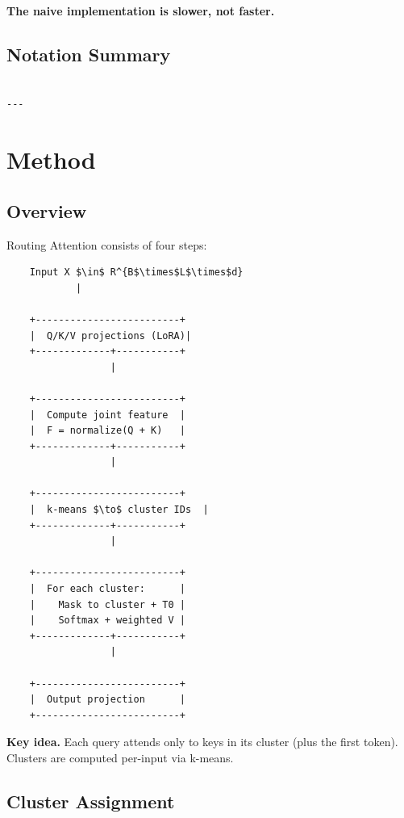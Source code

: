\textbf{The naive implementation is slower, not faster.}

\subsection{Notation Summary}

\begin{lstlisting}

---
\end{lstlisting}


\section{Method}

\subsection{Overview}

Routing Attention consists of four steps:

\begin{lstlisting}
    Input X $\in$ R^{B$\times$L$\times$d}
            |
             
    +-------------------------+
    |  Q/K/V projections (LoRA)|
    +-------------+-----------+
                  |
                   
    +-------------------------+
    |  Compute joint feature  |
    |  F = normalize(Q + K)   |
    +-------------+-----------+
                  |
                   
    +-------------------------+
    |  k-means $\to$ cluster IDs  |
    +-------------+-----------+
                  |
                   
    +-------------------------+
    |  For each cluster:      |
    |    Mask to cluster + T0 |
    |    Softmax + weighted V |
    +-------------+-----------+
                  |
                   
    +-------------------------+
    |  Output projection      |
    +-------------------------+
\end{lstlisting}

\textbf{Key idea.} Each query attends only to keys in its cluster (plus the first 
token). Clusters are computed per-input via k-means.

\subsection{Cluster Assignment}

